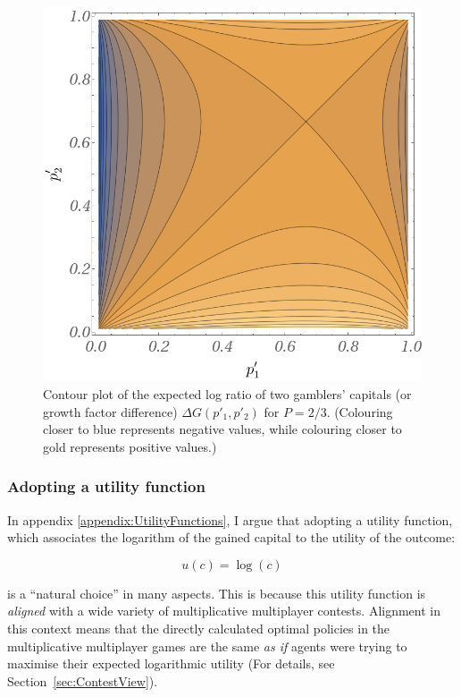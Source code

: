 \documentclass{article}
\theoremstyle{definition}
\begin{document}
\begin{figure}[H]
    \centering
    \includegraphics[width=12 cm]{img/Ratio.png}
    \caption{Contour plot of the expected log ratio of two gamblers' capitals (or growth factor difference) $\Delta G(p'_1,p'_2)$ for $P=2/3$. (Colouring closer to blue represents negative values, while colouring closer to gold represents positive values.)}
    \label{fig:LogRatio}
\end{figure}


\subsubsection{Adopting a utility function}

In appendix \ref{appendix:UtilityFunctions}, I argue that adopting a utility function, which associates the logarithm of the gained capital to the utility of the outcome:

\begin{equation}
    u(c) = \log(c)
\end{equation}

is a ``natural choice'' in many aspects. This is because this utility function is \emph{aligned} with a wide variety of multiplicative multiplayer contests.
Alignment in this context means that the directly calculated optimal policies in the multiplicative multiplayer games are the same \emph{as if} agents were trying to maximise their expected logarithmic utility (For details, see Section~\ref{sec:ContestView}). 
\end{document}
